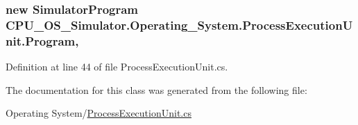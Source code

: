 \subsubsection[{Program}]{\setlength{\rightskip}{0pt plus 5cm}new {\bf Simulator\+Program} C\+P\+U\+\_\+\+O\+S\+\_\+\+Simulator.\+Operating\+\_\+\+System.\+Process\+Execution\+Unit.\+Program\hspace{0.3cm}{\ttfamily [get]}, {\ttfamily [set]}}\label{class_c_p_u___o_s___simulator_1_1_operating___system_1_1_process_execution_unit_ad5ee10381cd66c0681f1a7be91b679e4}


Definition at line 44 of file Process\+Execution\+Unit.\+cs.



The documentation for this class was generated from the following file\+:\begin{DoxyCompactItemize}
\item 
Operating System/\hyperlink{_process_execution_unit_8cs}{Process\+Execution\+Unit.\+cs}\end{DoxyCompactItemize}
